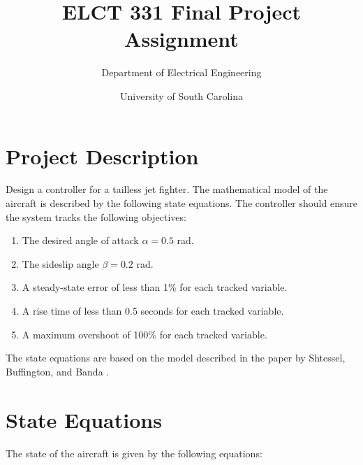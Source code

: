 \documentclass[11pt]{article}
\title{ELCT 331 Final Project Assignment}
\author{Department of Electrical Engineering}
\date{University of South Carolina}
\begin{document}
\maketitle

\section*{Project Description}
Design a controller for a tailless jet fighter. The mathematical model of the aircraft is described by the following state equations. The controller should ensure the system tracks the following objectives:
\begin{enumerate}
    \item The desired angle of attack \( \alpha = 0.5 \) rad.
    \item The sideslip angle \( \beta = 0.2 \) rad.
    \item A steady-state error of less than 1\% for each tracked variable.
    \item A rise time of less than 0.5 seconds for each tracked variable.
    \item A maximum overshoot of 100\% for each tracked variable.
\end{enumerate}
 The state equations are based on the model described in the paper by Shtessel, Buffington, and Banda \cite{shtessel2002tailless}.


\section*{State Equations}
The state of the aircraft is given by the following equations:
\end{document}
